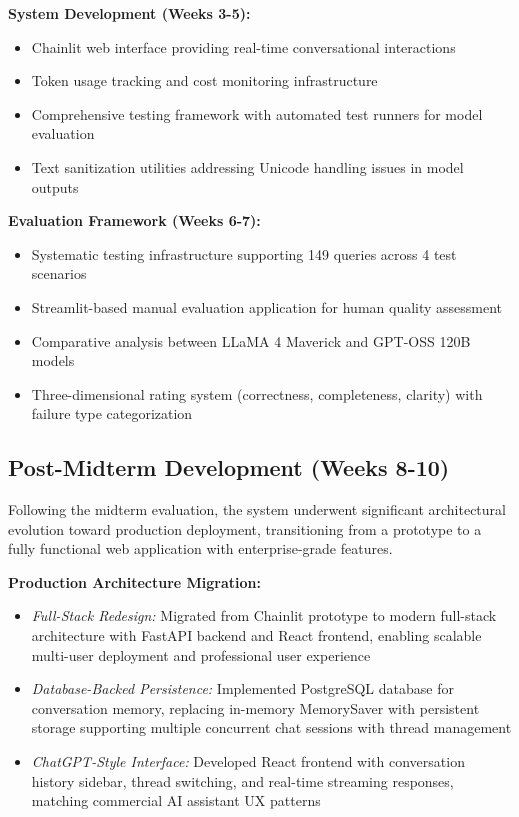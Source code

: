 \documentclass{article}
\begin{document}
\textbf{System Development (Weeks 3-5):}
\begin{itemize}
    \item Chainlit web interface providing real-time conversational interactions
    \item Token usage tracking and cost monitoring infrastructure
    \item Comprehensive testing framework with automated test runners for model evaluation
    \item Text sanitization utilities addressing Unicode handling issues in model outputs
\end{itemize}

\textbf{Evaluation Framework (Weeks 6-7):}
\begin{itemize}
    \item Systematic testing infrastructure supporting 149 queries across 4 test scenarios
    \item Streamlit-based manual evaluation application for human quality assessment
    \item Comparative analysis between LLaMA 4 Maverick and GPT-OSS 120B models
    \item Three-dimensional rating system (correctness, completeness, clarity) with failure type categorization
\end{itemize}

\subsection{Post-Midterm Development (Weeks 8-10)}

Following the midterm evaluation, the system underwent significant architectural evolution toward production deployment, transitioning from a prototype to a fully functional web application with enterprise-grade features.

\textbf{Production Architecture Migration:}

\begin{itemize}

\item \textit{Full-Stack Redesign:} Migrated from Chainlit prototype to modern full-stack architecture with FastAPI backend and React frontend, enabling scalable multi-user deployment and professional user experience

\item \textit{Database-Backed Persistence:} Implemented PostgreSQL database for conversation memory, replacing in-memory MemorySaver with persistent storage supporting multiple concurrent chat sessions with thread management

\item \textit{ChatGPT-Style Interface:} Developed React frontend with conversation history sidebar, thread switching, and real-time streaming responses, matching commercial AI assistant UX patterns

\end{itemize}
\end{document}
